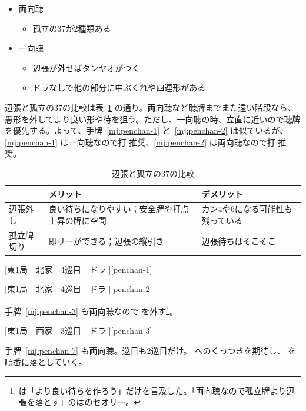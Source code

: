 \documentclass[../nankiru_main.tex]{subfiles}
\begin{document}
\begin{itemize}
  \item 両向聴\citep{yuusee-389}
  \begin{itemize}
    \item 孤立の37が2種類ある
  \end{itemize}
  \item 一向聴\citep{yuusee-126}
  \begin{itemize}
    \item 辺張が外せばタンヤオがつく
    \item ドラなしで他の部分に中ぶくれや四連形がある
  \end{itemize}
\end{itemize}

辺張と孤立の37の比較は表~\ref{tab:penchan-vs-37} の通り\citep{yuusee-389}。両向聴など聴牌までまた遠い階段なら、愚形を外してより良い形や待を狙う。ただし、一向聴の時、立直に近いので聴牌を優先する。よって、手牌~\ref{mj:penchan-1} と~\ref{mj:penchan-2} は似ているが、\ref{mj:penchan-1} は一向聴なので打  推奨、\ref{mj:penchan-2} は両向聴なので打  推奨。

\begin{table}[ht]
  \centering
  \begin{tabular}{lp{17ex}p{17ex}}
    & メリット & デメリット \\
    \hline
    辺張外し & 良い待ちになりやすい；安全牌や打点上昇の牌に空間 & カン4や6になる可能性も残っている \\
    孤立牌切り & 即リーができる；辺張の縦引き & 辺張待ちはそこそこ
  \end{tabular}
  \caption{辺張と孤立の37の比較}
  \label{tab:penchan-vs-37}
\end{table}

[東1局　北家　4巡目　ドラ ][penchan-1]

[東1局　北家　4巡目　ドラ ][penchan-2]

手牌~\ref{mj:penchan-3} も両向聴なので  を外す\footnote{\citet[pp. 48--55]{tetsusenryaku}は「より良い待ちを作ろう」だけを言及した。「両向聴なので孤立牌より辺張を落とす」のは\citet{yuusee-389}のセオリー。}。

[東1局　西家　3巡目　ドラ ][penchan-3]

手牌~\ref{mj:penchan-7} も両向聴。巡目も2巡目だけ。 へのくっつきを期待し、 を順番に落としていく\citep[][pp.~66--67]{fkt}。
\end{document}
